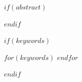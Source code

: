 $if(abstract)$
\begin{abstract}
$abstract$
\end{abstract}
$endif$

$if(keywords)$
\begin{keyword}
$for(keywords)$
$endfor$\end{keyword}
$endif$
